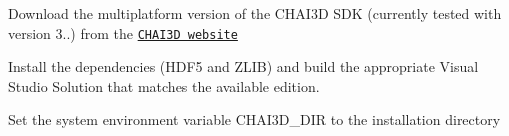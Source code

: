 \begin{DoxyEnumerate}
\item Download the multiplatform version of the C\+H\+A\+I3D S\+DK (currently tested with version 3..) from the \href{http://www.chai3d.org/download/releases}{\tt C\+H\+A\+I3D website}
\item Install the dependencies (H\+D\+F5 and Z\+L\+IB) and build the appropriate Visual Studio Solution that matches the available edition.
\item Set the system environment variable C\+H\+A\+I3\+D\+\_\+\+D\+IR to the installation directory 
\end{DoxyEnumerate}